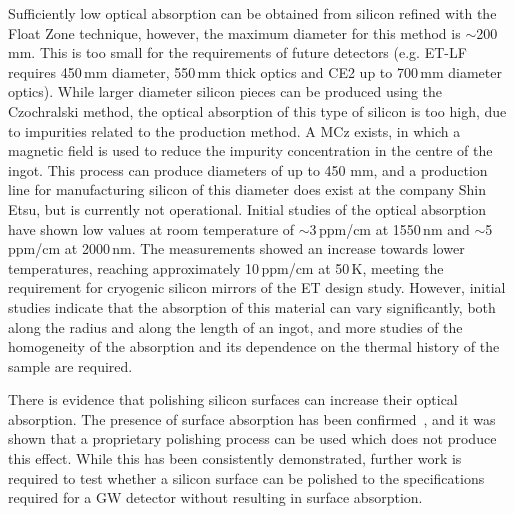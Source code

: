 Sufficiently low optical absorption can be obtained from silicon refined with the Float Zone technique, however, the maximum diameter for this method is $\sim$200\,mm. This is too small for the requirements of future detectors (e.g. \ac{ET-LF} requires 450\,mm diameter, 550\,mm thick optics and \ac{CE2} up to 700\,mm diameter optics). While larger diameter silicon pieces can be produced using the Czochralski method, the optical absorption of this type of silicon is too high, due to impurities related to the production method. A \ac{MCz} exists, in which a magnetic field is used to reduce the impurity concentration in the centre of the ingot. This process can produce diameters of up to 450 mm, and a production line for manufacturing silicon of this diameter does exist at the company Shin Etsu, but is currently not operational. Initial studies of the optical absorption have shown low values at room temperature of $\sim$3\,ppm/cm at 1550\,nm and $\sim$5\,ppm/cm at 2000\,nm. The measurements showed an increase towards lower temperatures, reaching approximately 10\,ppm/cm at 50\,K, meeting the requirement for cryogenic silicon mirrors of the \ac{ET}  design study. However, initial studies indicate that the absorption of this material can vary significantly, both along the radius and along the length of an ingot, and more studies of the homogeneity of the absorption and its dependence on the thermal history of the sample are required. 

There is evidence that polishing silicon surfaces can increase their optical absorption. 
The presence of surface absorption has been confirmed~\cite{SiliconSurfaceAbsorpBell2017}, and it was shown that a proprietary polishing process can be used which does not produce this effect. 
While this has been consistently demonstrated, further work is required to test whether a silicon surface can be polished to the specifications required for a \ac{GW}   detector without resulting in surface absorption.

